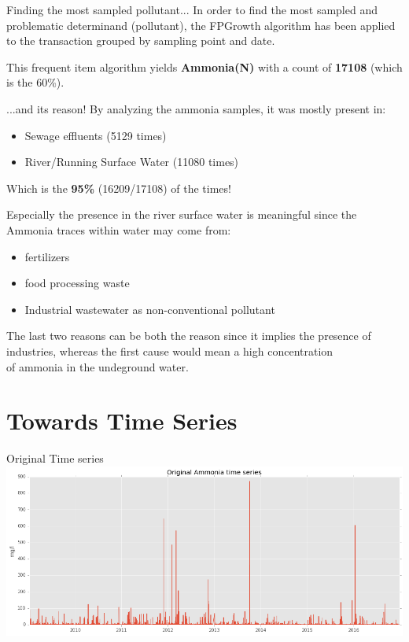 \documentclass[british]{beamer}
\begin{document}
\begin{frame}{Finding the most sampled pollutant...}
	In order to find the most sampled and problematic determinand (pollutant), the FPGrowth algorithm has been applied to the transaction grouped by sampling point and date.
	
	This frequent item algorithm yields \textbf{Ammonia(N)} with a count of \textbf{17108} (which is the 60\%).
	
\end{frame}

\begin{frame}{...and its reason!}
	By analyzing the ammonia samples, it was mostly present in:
	\begin{itemize}
		\item Sewage effluents (5129 times)
		\item River/Running Surface Water (11080 times)	
	\end{itemize}
	Which is the \textbf{95\%} (16209/17108) of the times!
	
	Especially the presence in the river surface water is meaningful since the Ammonia traces within water may come from:
	\begin{itemize}
		\item fertilizers
		\item food processing waste
		\item Industrial wastewater as non-conventional pollutant
	\end{itemize}
	
	The last two reasons can be both the reason since it implies the presence of industries, whereas the first cause would mean a high concentration  \\ of ammonia in the undeground water.
\end{frame}
	
\section{Towards Time Series}

\begin{frame}{Original Time series}
	\includegraphics[width=1\textwidth]{./Imgs/original_ts.png}
\end{frame}
\end{document}
